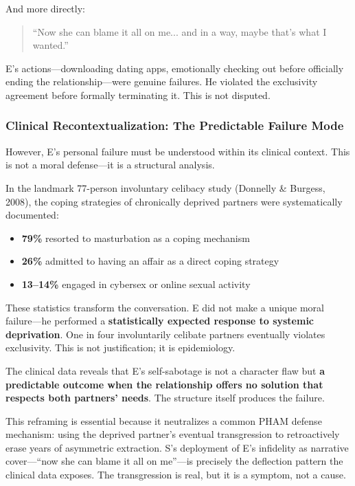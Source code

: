 \documentclass[12pt, letterpaper]{article}
\begin{document}
And more directly:

\begin{quote}
``Now she can blame it all on me... and in a way, maybe that's what I wanted.''
\end{quote}

E's actions---downloading dating apps, emotionally checking out before officially ending the relationship---were genuine failures. He violated the exclusivity agreement before formally terminating it. This is not disputed.

\subsubsection{Clinical Recontextualization: The Predictable Failure Mode}

However, E's personal failure must be understood within its clinical context. This is not a moral defense---it is a structural analysis.

In the landmark 77-person involuntary celibacy study (Donnelly \& Burgess, 2008), the coping strategies of chronically deprived partners were systematically documented:

\begin{itemize}
    \item \textbf{79\%} resorted to masturbation as a coping mechanism
    \item \textbf{26\%} admitted to having an affair as a direct coping strategy
    \item \textbf{13--14\%} engaged in cybersex or online sexual activity
\end{itemize}

These statistics transform the conversation. E did not make a unique moral failure---he performed a \textbf{statistically expected response to systemic deprivation}. One in four involuntarily celibate partners eventually violates exclusivity. This is not justification; it is epidemiology.

The clinical data reveals that E's self-sabotage is not a character flaw but \textbf{a predictable outcome when the relationship offers no solution that respects both partners' needs}. The structure itself produces the failure.

This reframing is essential because it neutralizes a common PHAM defense mechanism: using the deprived partner's eventual transgression to retroactively erase years of asymmetric extraction. S's deployment of E's infidelity as narrative cover---``now she can blame it all on me''---is precisely the deflection pattern the clinical data exposes. The transgression is real, but it is a symptom, not a cause.
\end{document}
